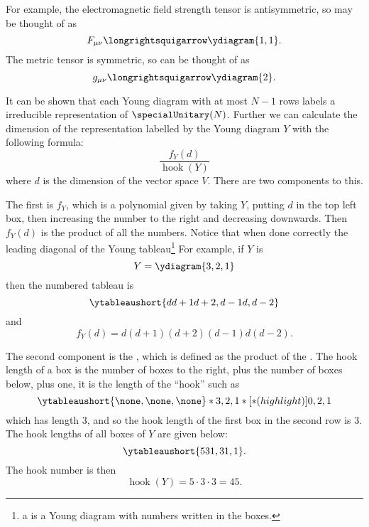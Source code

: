 \documentclass[fleqn]{NotesClass}
\DeclareMathOperator{\hook}{hook}
\begin{document}
    For example, the electromagnetic field strength tensor is antisymmetric, so may be thought of as
    \begin{equation}
        F_{\mu\nu} \longrightsquigarrow \ydiagram{1,1}.
    \end{equation}
    The metric tensor is symmetric, so can be thought of as
    \begin{equation}
        g_{\mu\nu} \longrightsquigarrow \ydiagram{2}.
    \end{equation}
    
    It can be shown that each Young diagram with at most \(N - 1\) rows labels a irreducible representation of \(\specialUnitary(N)\).
    Further we can calculate the dimension of the representation labelled by the Young diagram \(Y\) with the following formula:
    \begin{equation}
        \frac{f_Y(d)}{\hook(Y)}
    \end{equation}
    where \(d\) is the dimension of the vector space \(V\).
    There are two components to this.
    
    The first is \(f_Y\), which is a polynomial given by taking \(Y\), putting \(d\) in the top left box, then increasing the number to the right and decreasing downwards.
    Then \(f_Y(d)\) is the product of all the numbers.
    Notice that when done correctly the leading diagonal of the Young tableau\footnote{a  is a Young diagram with numbers written in the boxes.}
    For example, if \(Y\) is
    \begin{equation}
        Y = \ydiagram{3,2,1}
    \end{equation}
    then the numbered tableau is
    \begin{equation}
        \ytableaushort{d{d+1}{d+2},{d-1}d,{d-2}}
    \end{equation}
    and
    \begin{equation}
        f_Y(d) = d(d+1)(d+2)(d-1)d(d-2).
    \end{equation}
    
    The second component is the , which is defined as the product of the .
    The hook length of a box is the number of boxes to the right, plus the number of boxes below, plus one, it is the length of the \enquote{hook} such as
    \begin{equation}
        \ytableaushort{\none,\none,\none}*{3,2,1}*[*(highlight)]{0,2,1}
    \end{equation}
    which has length 3, and so the hook length of the first box in the second row is 3.
    The hook lengths of all boxes of \(Y\) are given below:
    \begin{equation}
        \ytableaushort{531,31,1}.
    \end{equation}
    The hook number is then
    \begin{equation}
        \hook(Y) = 5\cdot 3 \cdot 3 = 45.
    \end{equation}
    
\end{document}
